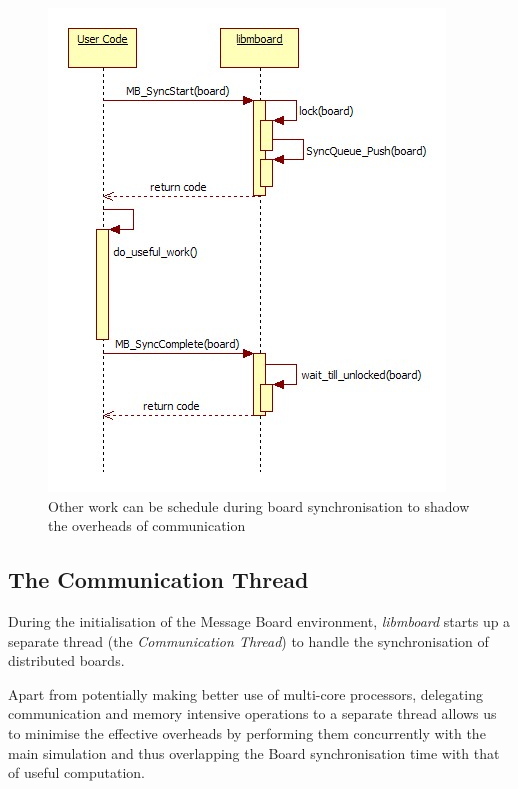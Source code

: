 \begin{figure}[h]
 \centering
  \includegraphics[scale=0.70]{syncboard.jpg}
 \caption{Other work can be schedule during board synchronisation to shadow the overheads of communication}
 \label{fig:syncboard}
\end{figure}

\subsection{The Communication Thread}
\label{sec:commthread}

During the initialisation of the Message Board environment, \textit{libmboard} starts up a separate thread (the \textit{Communication Thread}) to handle the synchronisation of distributed boards. 

Apart from potentially making better use of multi-core processors, delegating communication and memory intensive operations to a separate thread allows us to minimise the effective overheads by performing them concurrently with the main simulation and thus overlapping the Board synchronisation time with that of useful computation.

